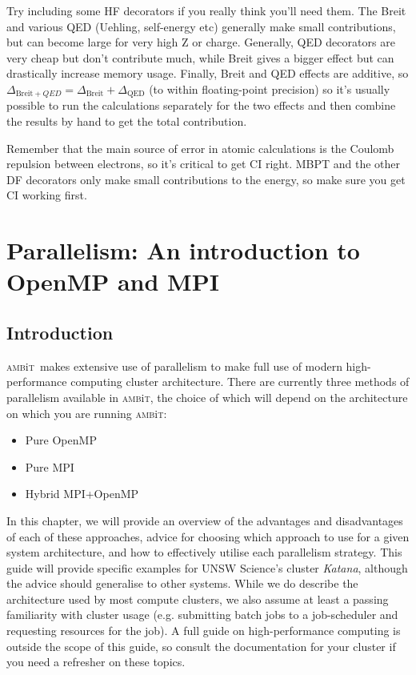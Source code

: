 \documentclass{report}
\newcommand{\ambit}{\textsc{amb}{\footnotesize i}\textsc{t}}
\begin{document}
\begin{enumerate}
  Try including some HF decorators if you really think you'll need them.
  The Breit and various QED (Uehling, self-energy etc) generally make
  small contributions, but can become large for very high Z or charge.
  Generally, QED decorators are very cheap but don't contribute much,
  while Breit gives a bigger effect but can drastically increase memory
  usage. Finally, Breit and QED effects are additive, so $\Delta_{\mathrm{Breit} +
  QED} = \Delta_{\mathrm{Breit}} + \Delta_{\mathrm{QED}}$ (to within floating-point precision) so it's
  usually possible to run the calculations separately for the two effects and then combine the results 
  by hand to get the total contribution.
\end{enumerate}

Remember that the main source of error in atomic calculations is the Coulomb repulsion between
electrons, so it's critical to get CI right. MBPT and the other DF decorators only make small 
contributions to the energy, so make sure you get CI working first.


\chapter{Parallelism: An introduction to OpenMP and MPI}
\label{chap:HPC}

\section{Introduction}
\ambit\ makes extensive use of parallelism to make full use of modern high-performance computing cluster
architecture. There are currently three methods of parallelism available in \ambit, the choice of which
will depend on the architecture on which you are running \ambit:

\begin{itemize}
    \item Pure OpenMP
    \item Pure MPI
    \item Hybrid MPI+OpenMP
\end{itemize}

In this chapter, we will provide an overview of the advantages and disadvantages of each of these
approaches, advice for choosing which approach to use for a given system architecture, and how to
effectively utilise each parallelism strategy. This guide will provide specific examples for UNSW 
Science's cluster \textit{Katana}, although the advice should generalise to other systems. While we do
describe the architecture used by most compute clusters, we also assume at least a passing familiarity
with cluster usage (e.g. submitting batch jobs to a job-scheduler and requesting resources for the job).
A full guide on high-performance computing is outside the scope of this guide, so consult the
documentation for your cluster if you need a refresher on these topics.
\end{document}
